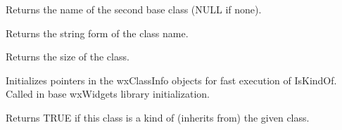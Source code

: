 Returns the name of the second base class (NULL if none).



Returns the string form of the class name.



Returns the size of the class.



Initializes pointers in the wxClassInfo objects for fast execution
of IsKindOf. Called in base wxWidgets library initialization.

\label{wxclassinfoiskindof}


Returns TRUE if this class is a kind of (inherits from) the given class.


